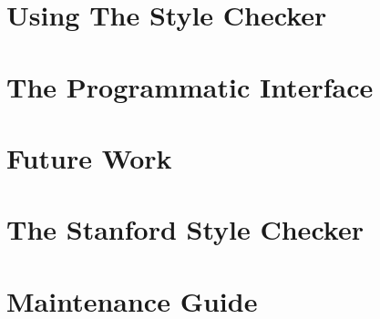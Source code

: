 \chapter{Using The Style Checker}
\label{usage}


\chapter{The Programmatic Interface}
\label{prog-interf}


\chapter{Future Work}
\label{future}





\appendix

\newenvironment{stylerule}[2]
{

\vspace{6pt}

\Large {\bf Rule No. #1 - #2} \normalsize
}{}

\newcommand{\guideline}[1]{\large {\bf Guideline:} \normalsize \\ #1

\vspace{10pt}

}

\newcommand{\ssl}[1]{\large {\bf SSL form:} \normalsize \\ {\tt #1} 

\vspace{10pt}

}

\newcommand{\internal}[1]{\large {\bf Internal Representation:} \normalsize
\\ {\tt #1}

\vspace{10pt}

}

\newcommand{\descr}[1]{\large {\bf Description:} \normalsize \\ #1

\vspace{10pt}

}

\newcommand{\remarks}[1]{\large {\bf Remarks:} \normalsize \\ #1

\vspace{10pt}

}

\chapter{The Stanford Style Checker}
\label{stanford}


\chapter{Maintenance Guide}
\label{maint}




